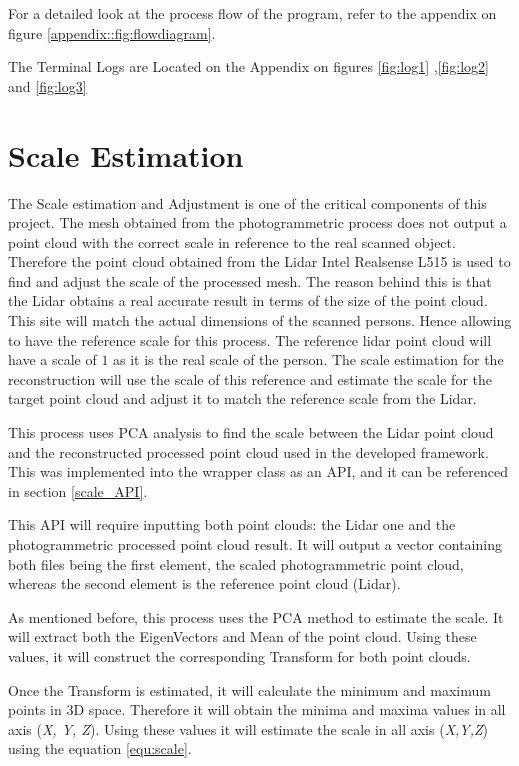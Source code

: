 \documentclass[12pt]{report}
\begin{document}
For a detailed look at the process flow of the program, refer to the appendix on figure \ref{appendix::fig:flowdiagram}.

The Terminal Logs are Located  on the Appendix on figures \ref{fig:log1} ,\ref{fig:log2} and \ref{fig:log3}






\section{Scale Estimation}
\label{sectoin:Scale_est}
The Scale estimation and Adjustment is one of the critical components of this project. 
The mesh obtained from the photogrammetric process does not output a point cloud with the correct scale in reference to the real scanned object. 
Therefore the point cloud obtained from the Lidar Intel Realsense L515 is used to find and adjust the scale of the processed mesh. 
The reason behind this is that the Lidar obtains a real accurate result in terms of the size of the point cloud. 
This site will match the actual dimensions of the scanned persons. Hence allowing to have the reference scale for this process. 
The reference lidar point cloud will have a scale of $1$ as it is the real scale of the person. 
The scale estimation for the reconstruction will use the scale of this reference and estimate the scale for the target point cloud and adjust it to match the reference scale from the Lidar. 

This process uses PCA analysis to find the scale between the Lidar point cloud and the reconstructed processed point cloud used in the developed framework. 
This was implemented into the wrapper class as an API, and it can be referenced in section \ref{scale_API}.

This API will require inputting both point clouds: the Lidar one and the photogrammetric processed point cloud result. It will output a  vector containing both files being the first element, the scaled photogrammetric point cloud, whereas the second element is the reference point cloud (Lidar).

As mentioned before, this process uses the PCA method to estimate the scale.
It will extract both the EigenVectors and Mean of the point cloud. 
Using these values, it will construct the corresponding Transform for both point clouds. 

Once the Transform is estimated, it will calculate the minimum and maximum points in 3D space. Therefore it will obtain the minima and maxima values in all axis (\textit{X, Y, Z}).
Using these values it will estimate the scale in all axis (\textit{X,Y,Z}) using the equation  \ref{equ:scale}.
\end{document}
